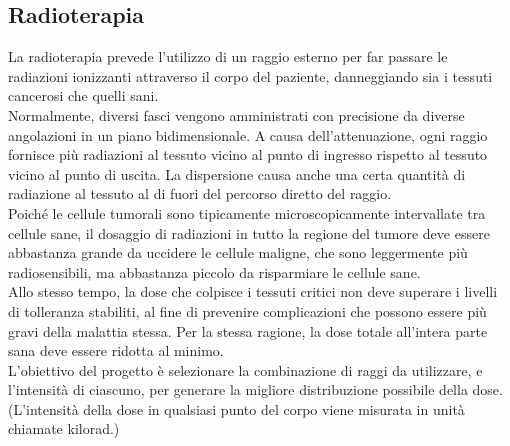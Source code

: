 \documentclass[a4paper]{extarticle}
\begin{document}
\vspace{1em}
\noindent
\subsection{Radioterapia}
La radioterapia prevede l'utilizzo di un raggio esterno per far passare le radiazioni ionizzanti attraverso il corpo del paziente, danneggiando sia i tessuti cancerosi che quelli sani.\\
Normalmente, diversi fasci vengono amministrati con precisione da diverse angolazioni in un piano bidimensionale. A causa dell'attenuazione, ogni raggio fornisce più radiazioni al tessuto vicino al punto di ingresso rispetto al tessuto vicino al punto di uscita. La dispersione causa anche una certa quantità di radiazione al tessuto al di fuori del percorso diretto del raggio.\\
Poiché le cellule tumorali sono tipicamente microscopicamente intervallate tra cellule sane, il dosaggio di radiazioni in tutto la regione del tumore deve essere abbastanza grande da uccidere le cellule maligne, che sono leggermente più radiosensibili, ma abbastanza piccolo da risparmiare le cellule sane.\\
Allo stesso tempo, la dose che colpisce i tessuti critici non deve superare i livelli di tolleranza stabiliti, al fine di prevenire complicazioni che possono essere più gravi della malattia stessa. Per la stessa ragione, la dose totale all'intera parte sana deve essere ridotta al minimo.\\
L'obiettivo del progetto è selezionare la combinazione di raggi da utilizzare, e l'intensità di ciascuno, per generare la migliore distribuzione possibile della dose. (L'intensità della dose in qualsiasi punto del corpo viene misurata in unità chiamate kilorad.)
\end{document}
